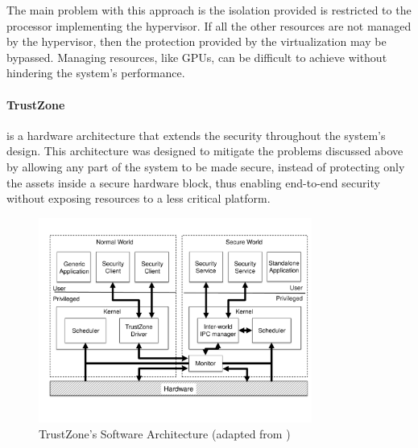 The main problem with this approach is the isolation provided is restricted to the processor implementing the hypervisor. If all the other resources are not managed by the hypervisor, then the protection provided by the virtualization may be bypassed. Managing resources, like \ac{GPUs}, can be difficult to achieve without hindering the system's performance.

\paragraph{\textbf{TrustZone}} is a hardware architecture that extends the security throughout the system's design. This architecture was designed to mitigate the problems discussed above by allowing any part of the system to be made secure, instead of protecting only the assets inside a secure hardware block, thus enabling end-to-end security without exposing resources to a less critical platform.

\begin{figure}[t!]
	\centering
	\includegraphics[width=0.80\textwidth]{img/trustzone.pdf}
	\caption{TrustZone's Software Architecture (adapted from \cite{trustzone_whitepaper})}
	\label{fig:trustzone_architecture}
\end{figure}

